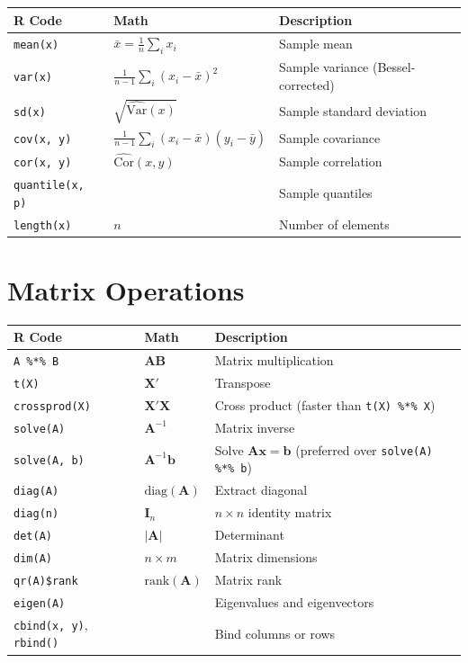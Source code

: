 \documentclass[11pt]{article}
\begin{document}
\begin{tabular}{@{}lll@{}}
\toprule
\textbf{R Code} & \textbf{Math} & \textbf{Description} \\
\midrule
\texttt{mean(x)} & $\bar{x} = \frac{1}{n}\sum_i x_i$ & Sample mean \\
\texttt{var(x)} & $\frac{1}{n-1}\sum_i (x_i - \bar{x})^2$ & Sample variance (Bessel-corrected) \\
\texttt{sd(x)} & $\sqrt{\widehat{\text{Var}}(x)}$ & Sample standard deviation \\
\texttt{cov(x, y)} & $\frac{1}{n-1}\sum_i(x_i-\bar{x})(y_i-\bar{y})$ & Sample covariance \\
\texttt{cor(x, y)} & $\widehat{\text{Cor}}(x,y)$ & Sample correlation \\
\texttt{quantile(x, p)} & & Sample quantiles \\
\texttt{length(x)} & $n$ & Number of elements \\
\bottomrule
\end{tabular}

\section*{Matrix Operations}

\begin{tabular}{@{}lll@{}}
\toprule
\textbf{R Code} & \textbf{Math} & \textbf{Description} \\
\midrule
\texttt{A \%*\% B} & $\bm{AB}$ & Matrix multiplication \\
\texttt{t(X)} & $\bm{X}'$ & Transpose \\
\texttt{crossprod(X)} & $\bm{X}'\bm{X}$ & Cross product (faster than \texttt{t(X) \%*\% X}) \\
\texttt{solve(A)} & $\bm{A}^{-1}$ & Matrix inverse \\
\texttt{solve(A, b)} & $\bm{A}^{-1}\bm{b}$ & Solve $\bm{Ax}=\bm{b}$ (preferred over \texttt{solve(A) \%*\% b}) \\
\texttt{diag(A)} & $\text{diag}(\bm{A})$ & Extract diagonal \\
\texttt{diag(n)} & $\bm{I}_n$ & $n\times n$ identity matrix \\
\texttt{det(A)} & $|\bm{A}|$ & Determinant \\
\texttt{dim(A)} & $n \times m$ & Matrix dimensions \\
\texttt{qr(A)\$rank} & $\text{rank}(\bm{A})$ & Matrix rank \\
\texttt{eigen(A)} & & Eigenvalues and eigenvectors \\
\texttt{cbind(x, y)}, \texttt{rbind()} & & Bind columns or rows \\
\bottomrule
\end{tabular}
\end{document}
